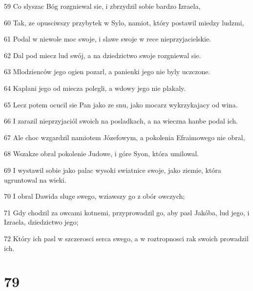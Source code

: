 \par 59 Co slyszac Bóg rozgniewal sie, i zbrzydzil sobie bardzo Izraela,
\par 60 Tak, ze opusciwszy przybytek w Sylo, namiot, który postawil miedzy ludzmi,
\par 61 Podal w niewole moc swoje, i slawe swoje w rece nieprzyjacielskie.
\par 62 Dal pod miecz lud swój, a na dziedzictwo swoje rozgniewal sie.
\par 63 Mlodzienców jego ogien pozarl, a panienki jego nie byly uczczone.
\par 64 Kaplani jego od miecza polegli, a wdowy jego nie plakaly.
\par 65 Lecz potem ocucil sie Pan jako ze snu, jako mocarz wykrzykajacy od wina.
\par 66 I zarazil nieprzyjaciól swoich na posladkach, a na wieczna hanbe podal ich.
\par 67 Ale choc wzgardzil namiotem Józefowym, a pokolenia Efraimowego nie obral,
\par 68 Wszakze obral pokolenie Judowe, i góre Syon, która umilowal.
\par 69 I wystawil sobie jako palac wysoki swiatnice swoje, jako ziemie, która ugruntowal na wieki.
\par 70 I obral Dawida sluge swego, wziawszy go z obór owczych;
\par 71 Gdy chodzil za owcami kotnemi, przyprowadzil go, aby pasl Jakóba, lud jego, i Izraela, dziedzictwo jego;
\par 72 Który ich pasl w szczerosci serca swego, a w roztropnosci rak swoich prowadzil ich.

\chapter{79}

